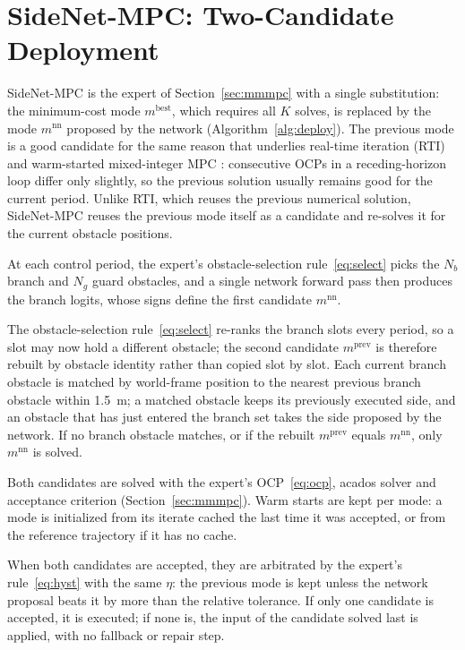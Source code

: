 \documentclass{article}
\theoremstyle{definition}
\begin{document}
\section{\texorpdfstring{SideNet-MPC: Two-Candidate Deployment}{SideNet-MPC: Two-Candidate Deployment}}
\label{sec:deploy}

SideNet-MPC is the expert of Section~\ref{sec:mmmpc} with a single substitution: the minimum-cost mode $m^{\mathrm{best}}$, which requires all $K$ solves, is replaced by the mode $m^{\mathrm{nn}}$ proposed by the network (Algorithm~\ref{alg:deploy}).  The previous mode is a good candidate for the same reason that underlies real-time iteration (RTI) \citep{diehl2005real} and warm-started mixed-integer MPC \citep{marcucci2020warm}: consecutive OCPs in a receding-horizon loop differ only slightly, so the previous solution usually remains good for the current period. Unlike RTI, which reuses the previous numerical solution, SideNet-MPC reuses the previous mode itself as a candidate and re-solves it for the current obstacle positions.

At each control period, the expert's obstacle-selection rule~\eqref{eq:select} picks the $N_b$ branch and $N_g$ guard obstacles, and a single network forward pass then produces the branch logits, whose signs define the first candidate $m^{\mathrm{nn}}$.

The obstacle-selection rule~\eqref{eq:select} re-ranks the branch slots every period, so a slot may now hold a different obstacle; the second candidate $m^{\mathrm{prev}}$ is therefore rebuilt by obstacle identity rather than copied slot by slot. Each current branch obstacle is matched by world-frame position to the nearest previous branch obstacle within \SI{1.5}{m}; a matched obstacle keeps its previously executed side, and an obstacle that has just entered the branch set takes the side proposed by the network. If no branch obstacle matches, or if the rebuilt $m^{\mathrm{prev}}$ equals $m^{\mathrm{nn}}$, only $m^{\mathrm{nn}}$ is solved.

Both candidates are solved with the expert's OCP~\eqref{eq:ocp}, acados solver and acceptance criterion (Section~\ref{sec:mmmpc}). Warm starts are kept per mode: a mode is initialized from its iterate cached the last time it was accepted, or from the reference trajectory if it has no cache.

When both candidates are accepted, they are arbitrated by the expert's rule~\eqref{eq:hyst} with the same $\eta$: the previous mode is kept unless the network proposal beats it by more than the relative tolerance. If only one candidate is accepted, it is executed; if none is, the input of the candidate solved last is applied, with no fallback or repair step.
\end{document}
